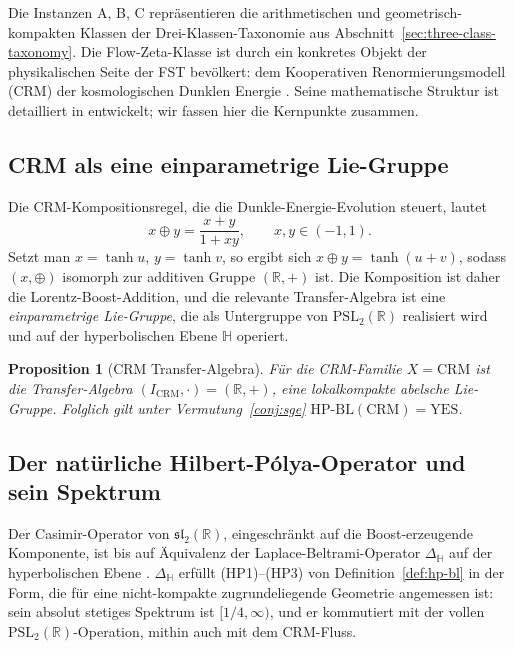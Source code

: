 \documentclass[11pt]{article}
\newtheorem{proposition}[theorem]{Proposition}
\theoremstyle{definition}
\theoremstyle{remark}
\newcommand{\HBL}{\mathrm{HP\text{-}BL}}
\newcommand{\PSL}{\mathrm{PSL}}
\begin{document}
Die Instanzen A, B, C repräsentieren die arithmetischen und geometrisch-kompakten
Klassen der Drei-Klassen-Taxonomie aus Abschnitt~\ref{sec:three-class-taxonomy}.
Die Flow-Zeta-Klasse ist durch ein konkretes Objekt der
physikalischen Seite der FST bevölkert: dem Kooperativen Renormierungsmodell (CRM)
der kosmologischen Dunklen Energie \cite{RFEPFramework}. Seine mathematische
Struktur ist detailliert in \cite{CRMFlowZetaNote} entwickelt; wir
fassen hier die Kernpunkte zusammen.

\subsection{CRM als eine einparametrige Lie-Gruppe}

Die CRM-Kompositionsregel, die die Dunkle-Energie-Evolution steuert, lautet
\begin{equation}
\label{eq:crm-composition}
  x \oplus y = \frac{x+y}{1+xy}, \qquad x, y \in (-1, 1).
\end{equation}
Setzt man $x = \tanh u$, $y = \tanh v$, so ergibt sich $x \oplus y = \tanh(u+v)$,
sodass $(x, \oplus)$ isomorph zur additiven Gruppe $(\mathbb{R},
+)$ ist. Die Komposition ist daher die Lorentz-Boost-Addition, und
die relevante Transfer-Algebra ist eine \emph{einparametrige Lie-Gruppe},
die als Untergruppe von $\PSL_2(\mathbb{R})$ realisiert wird und auf der
hyperbolischen Ebene $\mathbb{H}$ operiert.

\begin{proposition}[CRM Transfer-Algebra]\label{prop:crm-transfer}
Für die CRM-Familie $X = \mathrm{CRM}$ ist die Transfer-Algebra
$(I_{\mathrm{CRM}}, \cdot) = (\mathbb{R}, +)$, eine lokalkompakte
abelsche Lie-Gruppe. Folglich gilt unter Vermutung~\ref{conj:sge}
$\HBL(\mathrm{CRM}) = \mathrm{YES}$.
\end{proposition}

\subsection{Der natürliche Hilbert-P\'olya-Operator und sein Spektrum}

Der Casimir-Operator von $\mathfrak{sl}_2(\mathbb{R})$, eingeschränkt auf die
Boost-erzeugende Komponente, ist bis auf Äquivalenz der
Laplace-Beltrami-Operator $\Delta_{\mathbb{H}}$ auf der hyperbolischen
Ebene \cite{DyatlovZworski2019}. $\Delta_{\mathbb{H}}$ erfüllt
(HP1)--(HP3) von Definition~\ref{def:hp-bl} in der Form, die
für eine nicht-kompakte zugrundeliegende Geometrie angemessen ist: sein absolut stetiges
Spektrum ist $[1/4, \infty)$, und er kommutiert mit der vollen
$\PSL_2(\mathbb{R})$-Operation, mithin auch mit dem CRM-Fluss.
\end{document}
